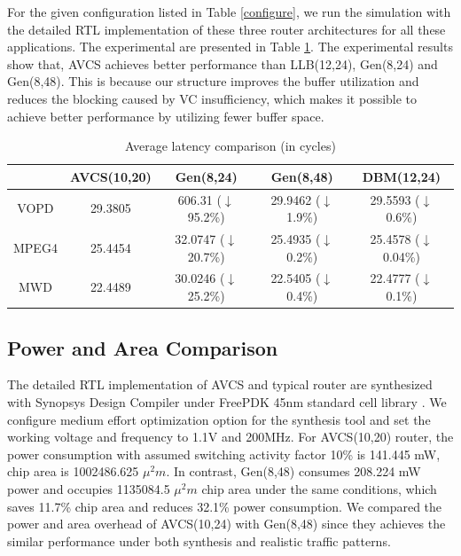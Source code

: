 \documentclass[10pt,conference]{IEEEtran}
\begin{document}
For the given configuration listed in Table \ref{configure}, we run the simulation with the detailed RTL implementation of these three router architectures for all these applications. The experimental are presented in Table \ref{realisticapp}. The experimental results show that, AVCS achieves better performance than LLB(12,24), Gen(8,24) and Gen(8,48). This is because our structure improves the buffer utilization and reduces the blocking caused by VC insufficiency, which makes it possible to achieve better performance by utilizing fewer buffer space.
\begin{table}
  \centering\caption{Average latency comparison (in cycles)}\label{realisticapp}
\begin{tabular}{|c|c|c|c|c|}
\hline
 & AVCS(10,20) & Gen(8,24) & Gen(8,48) & DBM(12,24)\\
\hline\hline
VOPD & 29.3805 & 606.31 ($\downarrow$ 95.2\%) & 29.9462 ($\downarrow$ 1.9\%) & 29.5593 ($\downarrow$ 0.6\%)\\
\hline
MPEG4 & 25.4454 & 32.0747 ($\downarrow$ 20.7\%) & 25.4935 ($\downarrow$ 0.2\%) & 25.4578 ($\downarrow$ 0.04\%)\\
\hline
MWD & 22.4489 & 30.0246 ($\downarrow$ 25.2\%) & 22.5405 ($\downarrow$ 0.4\%) & 22.4777 ($\downarrow$ 0.1\%)\\
\hline
\end{tabular}
\end{table}

\subsection{Power and Area Comparison}\label{area}
The detailed RTL implementation of AVCS and typical router are synthesized with Synopsys Design Compiler under FreePDK 45nm standard cell library \cite{nangate}. We configure medium effort optimization option for the synthesis tool and set the working voltage and frequency to 1.1V and 200MHz. For AVCS(10,20) router, the power consumption with assumed switching activity factor 10\% is 141.445 mW, chip area is 1002486.625 $\mu^2 m$. In contrast, Gen(8,48) consumes 208.224 mW power and occupies 1135084.5 $\mu^2 m$ chip area under the same conditions, which saves 11.7\% chip area and reduces 32.1\% power consumption. We compared the power and area overhead of AVCS(10,24) with Gen(8,48) since they achieves the similar performance under both synthesis and realistic traffic patterns.

\end{document}
